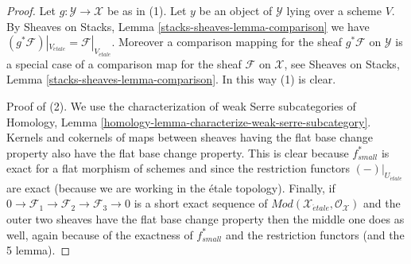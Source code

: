 \begin{proof}
Let $g : \mathcal{Y} \to \mathcal{X}$ be as in (1).
Let $y$ be an object of $\mathcal{Y}$ lying over a scheme $V$. By
Sheaves on Stacks, Lemma \ref{stacks-sheaves-lemma-comparison}
we have
$(g^*\mathcal{F})|_{V_{\acute{e}tale}} = \mathcal{F}|_{V_{\acute{e}tale}}$.
Moreover a comparison mapping for the sheaf $g^*\mathcal{F}$ on $\mathcal{Y}$
is a special case of a comparison map for the sheaf $\mathcal{F}$ on
$\mathcal{X}$, see
Sheaves on Stacks, Lemma \ref{stacks-sheaves-lemma-comparison}.
In this way (1) is clear.

\medskip\noindent
Proof of (2). We use the characterization of weak Serre subcategories of
Homology, Lemma \ref{homology-lemma-characterize-weak-serre-subcategory}.
Kernels and cokernels of
maps between sheaves having the flat base change property
also have the flat base change property. This is clear because
$f_{small}^*$ is exact for a flat morphism of schemes and since the
restriction functors $(-)|_{U_{\acute{e}tale}}$ are exact (because we
are working in the \'etale topology). Finally, if
$0 \to \mathcal{F}_1 \to \mathcal{F}_2 \to \mathcal{F}_3 \to 0$
is a short exact sequence of
$\textit{Mod}(\mathcal{X}_{\acute{e}tale}, \mathcal{O}_\mathcal{X})$
and the outer two sheaves have the flat base change property then
the middle one does as well, again because of the exactness of
$f_{small}^*$ and the restriction functors (and the 5 lemma).


\end{proof}
